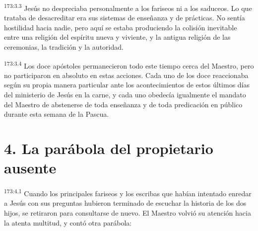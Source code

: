 \par 
\textsuperscript{173:3.3} Jesús no despreciaba personalmente a los fariseos ni a los saduceos. Lo que trataba de desacreditar era sus sistemas de enseñanza y de prácticas. No sentía hostilidad hacia nadie, pero aquí se estaba produciendo la colisión inevitable entre una religión del espíritu nueva y viviente, y la antigua religión de las ceremonias, la tradición y la autoridad.

\par 
\textsuperscript{173:3.4} Los doce apóstoles permanecieron todo este tiempo cerca del Maestro, pero no participaron en absoluto en estas acciones. Cada uno de los doce reaccionaba según su propia manera particular ante los acontecimientos de estos últimos días del ministerio de Jesús en la carne, y cada uno obedecía igualmente el mandato del Maestro de abstenerse de toda enseñanza y de toda predicación en público durante esta semana de la Pascua.

\section*{4. La parábola del propietario ausente}
\par 
\textsuperscript{173:4.1} Cuando los principales fariseos y los escribas que habían intentado enredar a Jesús con sus preguntas hubieron terminado de escuchar la historia de los dos hijos, se retiraron para consultarse de nuevo. El Maestro volvió su atención hacia la atenta multitud, y contó otra parábola:


